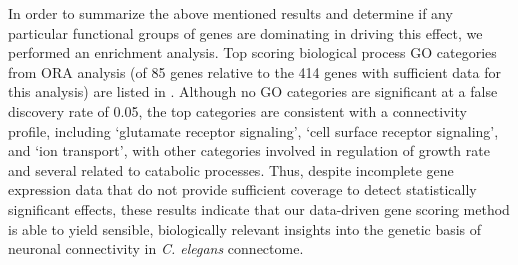 \documentclass[10pt,letterpaper]{article}
\begin{document}
{In order to summarize the above mentioned results and determine if any particular functional groups of genes are dominating in driving this effect, we performed an enrichment analysis.
Top scoring biological process GO categories from ORA analysis (of 85 genes relative to the 414 genes with sufficient data for this analysis) are listed in .
Although no GO categories are significant at a false discovery rate of 0.05, the top categories are consistent with a connectivity profile, including `glutamate receptor signaling', `cell surface receptor signaling', and `ion transport', with other categories involved in regulation of growth rate and several related to catabolic processes.
Thus, despite incomplete gene expression data that do not provide sufficient coverage to detect statistically significant effects, these results indicate that our data-driven gene scoring method is able to yield sensible, biologically relevant insights into the genetic basis of neuronal connectivity in \textit{C. elegans} connectome.

}
\end{document}
